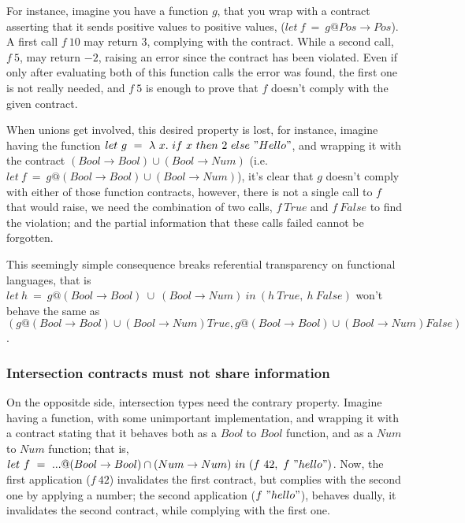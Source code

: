 For instance, imagine you have a function $g$, that
you wrap with a contract asserting that it sends positive values to positive values,
($let~f~=~g@Pos \rightarrow Pos$).
A first call $f~10$ may return $3$, complying with the contract.
While a second call, $f~5$, may return $-2$, raising an error since
the contract has been violated.
Even if only after evaluating both of this function calls
the error was found, the first one is not really needed, and $f~5$ is enough to
prove that $f$ doesn't comply with the given contract.

When unions get involved, this desired property is lost,
for instance, imagine having the function $let~g~=~\lambda~x.~if~x~then~2~else~"Hello"$,
and wrapping it with the contract $(Bool \rightarrow Bool) \cup (Bool \rightarrow Num)$
(i.e. $let~f~=~g@(Bool \rightarrow Bool) \cup (Bool \rightarrow Num)$),
it's clear that $g$ doesn't comply with either of those function contracts, however, there
is not a single call to $f$ that would raise, we need the combination of two calls,
$f~True$ and $f~False$ to find the violation; and the partial
information that these calls failed cannot be forgotten.


This seemingly simple consequence breaks referential transparency on
functional languages, that is
$let~h~=~g@(Bool \rightarrow Bool)~\cup~(Bool \rightarrow Num)~in~(h~True,~h~False)$
won't behave the same as 
$(g@(Bool \rightarrow Bool) \cup (Bool \rightarrow Num) True, g@(Bool \rightarrow Bool) \cup (Bool \rightarrow Num) False)$.


\subsubsection*{Intersection contracts must not share information}

On the oppositde side, intersection types need the contrary property.
Imagine having a function, with some unimportant implementation,
and wrapping it
with a contract stating that it behaves both as a $Bool$ to $Bool$ function,
and as a $Num$ to $Num$ function; that is, 
$let~f~=~...@(Bool \rightarrow Bool) \cap (Num \rightarrow Num)~in~(f~42,~f~"hello")$.
Now, the first application ($f~42$) invalidates the first contract, but complies with the second
one by applying a number; the second application ($f~"hello"$), behaves dually,
it invalidates the second contract,
while complying with the first one.

